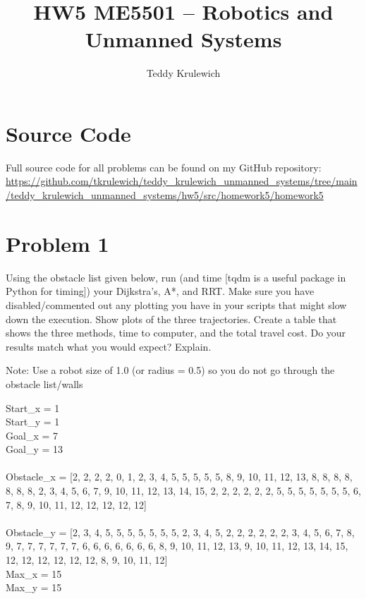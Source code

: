 \documentclass{article}
\author{Teddy Krulewich}
\title{\vspace{-4em}HW5 ME5501 – Robotics and Unmanned Systems}
\begin{document}
\maketitle

\section*{Source Code}

Full source code for all problems can be found on my GitHub repository:
\url{https://github.com/tkrulewich/teddy_krulewich_unmanned_systems/tree/main/teddy_krulewich_unmanned_systems/hw5/src/homework5/homework5}

\section*{Problem 1}

Using the obstacle list given below, run (and time [tqdm is a useful package in Python for timing]) 
your Dijkstra’s, A*, and RRT. Make sure you have disabled/commented out any plotting you have in 
your scripts that might slow down the execution. Show plots of the three trajectories. Create a table 
that shows the three methods, time to computer, and the total travel cost. Do your results match 
what you would expect? Explain.  

\bigskip
\noindent Note: Use a robot size of 1.0 (or radius = 0.5) so you do not go through the obstacle list/walls 

\bigskip
\noindent Start\_x = 1 \\
Start\_y = 1 \\
Goal\_x = 7 \\
Goal\_y = 13 \\ \\
Obstacle\_x = [2, 2, 2, 2, 0, 1, 2, 3, 4, 5, 5, 5, 5, 5, 8, 9, 10, 11, 12, 13, 8, 8, 8, 8, 8, 8, 8, 2, 3, 4, 5, 6, 7, 
9, 10, 11, 12, 13, 14, 15, 2, 2, 2, 2, 2, 2, 5, 5, 5, 5, 5, 5, 5, 6, 7, 8, 9, 10, 11, 12, 12, 12, 12, 12] \\ \\ 
Obstacle\_y = [2, 3, 4, 5, 5, 5, 5, 5, 5, 5, 2, 3, 4, 5, 2, 2, 2, 2, 2, 2, 3, 4, 5, 6, 7, 8, 9, 7, 7, 7, 7, 7, 7, 6, 6, 6, 
6, 6, 6, 6, 8, 9, 10, 11, 12, 13, 9, 10, 11, 12, 13, 14, 15, 12, 12, 12, 12, 12, 12, 8, 9, 10, 11, 12] \\
 
\noindent Max\_x = 15 \\
Max\_y = 15
\end{document}

